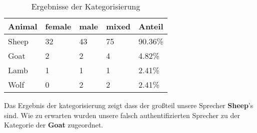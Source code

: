 \begin{table}[h]
	\centering
    \begin{tabular}{ | l | l | l | l | l |}
    \hline
    Animal & female & male & mixed & Anteil \\ \hline 
    Sheep 	& 32 	& 43	&	75	&	90.36\%	\\ \hline
    Goat	& 2		& 2		& 4 	&	4.82\% \\ \hline
    Lamb	& 1  	& 1		& 1		&	2.41\% \\ \hline
    Wolf	& 0  	& 2 	& 2		&	2.41\% \\ \hline
    \end{tabular}
    \caption{Ergebnisse der Kategorisierung}
   \label{table:resultsZoo}
\end{table}


Das Ergebnis der kategorisierung zeigt dass der großteil unsere Sprecher \textbf{Sheep}'s sind.
Wie zu erwarten wurden unsere falsch authentifizierten Sprecher zu der Kategorie der \textbf{Goat} zugeordnet.



